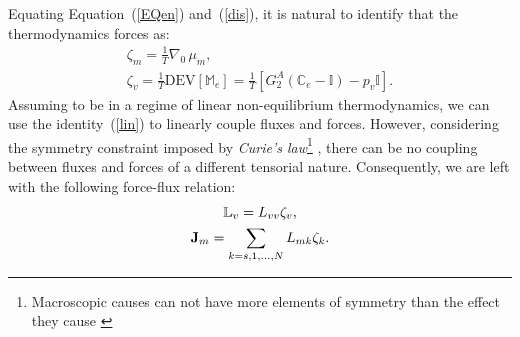 Equating Equation~(\ref{EQen}) and~(\ref{dis}), it is natural to identify that the thermodynamics forces as:
\begin{gather}
\zeta_m = \frac{1}{T} \nabla_0 \,\mu_m, \label{vflow1}\\
\zeta_v = \frac{1}{T} \text{DEV}[\mathbb{M}_e] = \frac{1}{T} \left[G^A_2(\mathbb{C}_e-\mathbb{I})-p_v\mathbb{I}\right].
\end{gather}
Assuming to be in a regime of linear non-equilibrium thermodynamics, we can use the identity~(\ref{lin}) to linearly couple fluxes and forces. However, considering the symmetry constraint imposed by \textit{Curie's law}\footnote{Macroscopic causes can not have more elements of symmetry than the effect they cause \cite{CIT}} , there can be no coupling between fluxes and forces of a different tensorial nature. Consequently, we are left with the following force-flux relation:
\begin{gather}
\mathbb{L}_v = L_{vv} \zeta_v,\label{vflow2}\\
\mathbf{J}_m = \sum_{k=s,1,\ldots,N} L_{mk} \zeta_k. \label{dif}
\end{gather}


